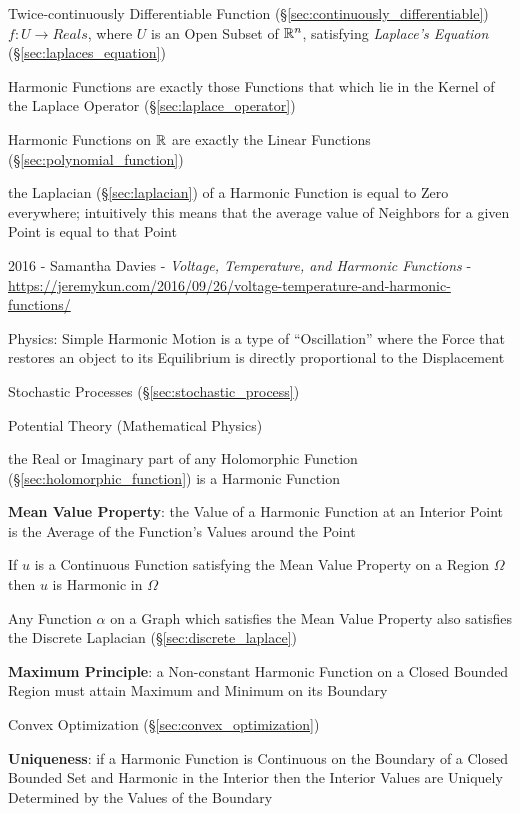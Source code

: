 Twice-continuously Differentiable Function
(\S\ref{sec:continuously_differentiable}) $f : U \rightarrow Reals$,
where $U$ is an Open Subset of $\mathbb{R}^n$, satisfying \emph{Laplace's
  Equation} (\S\ref{sec:laplaces_equation})

Harmonic Functions are exactly those Functions that which lie in the Kernel of
the Laplace Operator (\S\ref{sec:laplace_operator})

Harmonic Functions on $\mathbb{R}$ are exactly the Linear Functions
(\S\ref{sec:polynomial_function})

the Laplacian (\S\ref{sec:laplacian}) of a Harmonic Function is equal to Zero
everywhere; intuitively this means that the average value of Neighbors for a
given Point is equal to that Point

2016 - Samantha Davies - \emph{Voltage, Temperature, and Harmonic
  Functions} -
\url{https://jeremykun.com/2016/09/26/voltage-temperature-and-harmonic-functions/}

Physics: Simple Harmonic Motion is a type of ``Oscillation'' where the
Force that restores an object to its Equilibrium is directly
proportional to the Displacement

Stochastic Processes (\S\ref{sec:stochastic_process})

Potential Theory (Mathematical Physics) %

the Real or Imaginary part of any Holomorphic Function
(\S\ref{sec:holomorphic_function}) is a Harmonic Function


\textbf{Mean Value Property}: the Value of a Harmonic Function at an
Interior Point is the Average of the Function's Values around the
Point

If $u$ is a Continuous Function satisfying the Mean Value Property on
a Region $\Omega$ then $u$ is Harmonic in $\Omega$

Any Function $\alpha$ on a Graph which satisfies the Mean Value
Property also satisfies the Discrete Laplacian
(\S\ref{sec:discrete_laplace})


\textbf{Maximum Principle}: a Non-constant Harmonic Function on a
Closed Bounded Region must attain Maximum and Minimum on its Boundary

Convex Optimization (\S\ref{sec:convex_optimization})


\textbf{Uniqueness}: if a Harmonic Function is Continuous on the
Boundary of a Closed Bounded Set and Harmonic in the Interior then the
Interior Values are Uniquely Determined by the Values of the Boundary


